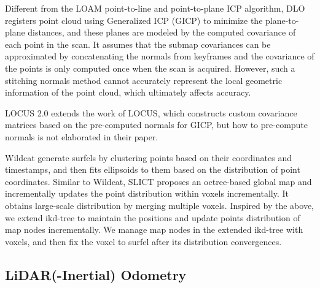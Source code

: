 \documentclass[letterpaper, 10 pt, conference]{ieeeconf}  %
\begin{document}
Different from the LOAM point-to-line and point-to-plane ICP algorithm, DLO\cite{chen2022direct} registers point cloud using Generalized ICP (GICP)\cite{segal2009generalized} to minimize the plane-to-plane distances,
and these planes are modeled by the computed covariance of each point in the scan.
It assumes that the submap covariances can be approximated by concatenating the normals from keyframes and the covariance of the points is only computed once when the scan is acquired.
However, such a stitching normals method cannot accurately represent the local geometric information of the point cloud, which ultimately affects accuracy.

LOCUS 2.0\cite{reinke2022locus2} extends the work of LOCUS\cite{palieri2020locus}, which constructs custom covariance matrices based on the pre-computed normals for GICP, but how to pre-compute normals is not elaborated in their paper.

Wildcat\cite{ramezani2022wildcat} generate surfels by clustering points based on their coordinates and timestamps, and then fits ellipsoids to them based on the distribution of point coordinates.
Similar to Wildcat, SLICT\cite{nguyen2023slict} proposes an octree-based global map and incrementally updates the point distribution within voxels incrementally.
It obtains large-scale distribution by merging multiple voxels.
Inspired by the above, we extend ikd-tree to maintain the positions and update points distribution of map nodes incrementally.
We manage map nodes in the extended ikd-tree with voxels, and then fix the voxel to surfel after its distribution convergences.

\subsection{LiDAR(-Inertial) Odometry}
\end{document}
